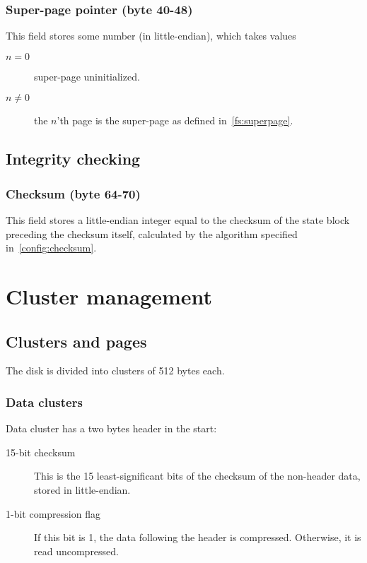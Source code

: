 \documentclass[11pt,a4paper]{report}
\newcommand{\clustersize}{512 }
\begin{document}
        \subsection{Super-page pointer (byte 40-48)}
        This field stores some number (in little-endian), which takes values

        \begin{description}
            \item [$n = 0$]    super-page uninitialized.
            \item [$n \neq 0$] the $n$'th page is the super-page as defined
                in~\ref{fs:superpage}.
        \end{description}

    \section{Integrity checking}
        \subsection{Checksum (byte 64-70)}
        This field stores a little-endian integer equal to the checksum of the
        state block preceding the checksum itself, calculated by the algorithm
        specified in~\ref{config:checksum}.

    \chapter{Cluster management}

    \section{Clusters and pages}
        The disk is divided into clusters of \clustersize bytes each.

        \subsection{Data clusters}
        Data cluster has a two bytes header in the start:

        \begin{description}
            \item [15-bit checksum] This is the 15 least-significant bits of
                the checksum of the non-header data, stored in little-endian.
            \item [1-bit compression flag] If this bit is 1, the data following
                the header is compressed. Otherwise, it is read uncompressed.
        \end{description}
\end{document}
